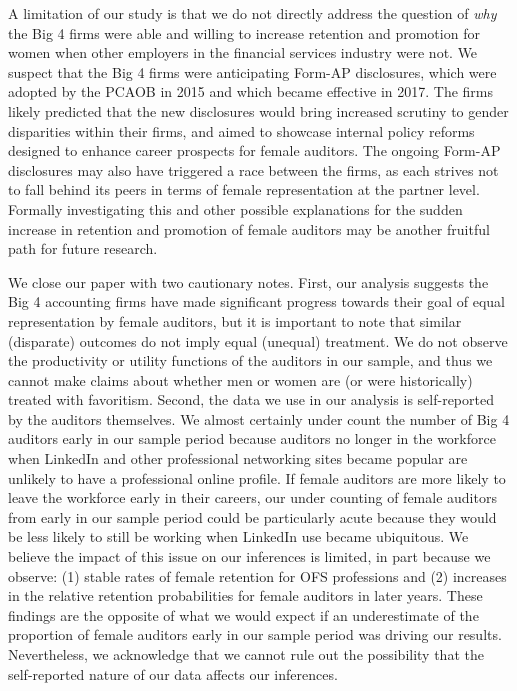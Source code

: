 \documentclass[11pt]{article}
\begin{document}
    A limitation of our study is that we do not directly address the question of \textit{why} the Big 4 firms were able and willing to increase retention and promotion for women when other employers in the financial services industry were not. We suspect that the Big 4 firms were anticipating Form-AP disclosures, which were adopted by the PCAOB in 2015 and which became effective in 2017. The firms likely predicted that the new disclosures would bring increased scrutiny to gender disparities within their firms, and aimed to showcase internal policy reforms designed to enhance career prospects for female auditors. The ongoing Form-AP disclosures may also have triggered a race between the firms, as each strives not to fall behind its peers in terms of female representation at the partner level. Formally investigating this and other possible explanations for the sudden increase in retention and promotion of female auditors may be another fruitful path for future research. 

    We close our paper with two cautionary notes. First, our analysis suggests the Big 4 accounting firms have made significant progress towards their goal of equal representation by female auditors, but it is important to note that similar (disparate) outcomes do not imply equal (unequal) treatment. We do not observe the productivity or utility functions of the auditors in our sample, and thus we cannot make claims about whether men or women are (or were historically) treated with favoritism. Second, the data we use in our analysis is self-reported by the auditors themselves. We almost certainly under count the number of Big 4 auditors early in our sample period because auditors no longer in the workforce when LinkedIn and other professional networking sites became popular are unlikely to have a professional online profile. If female auditors are more likely to leave the workforce early in their careers, our under counting of female auditors from early in our sample period could be particularly acute because they would be less likely to still be working when LinkedIn use became ubiquitous. We believe the impact of this issue on our inferences is limited, in part because we observe: (1) stable rates of female retention for OFS professions and (2) increases in the relative retention probabilities for female auditors in later years. These findings are the opposite of what we would expect if an underestimate of the proportion of female auditors early in our sample period was driving our results. Nevertheless, we acknowledge that we cannot rule out the possibility that the self-reported nature of our data affects our inferences.   
\end{document}
